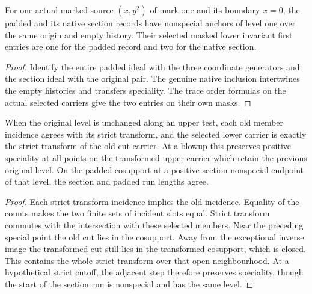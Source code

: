 \begin{theorem}
\label{hir:g1-positive-normal-joint-example}
\leanok
For one actual marked source $(x,y^2)$ of mark one and its boundary
$x=0$, the padded and its native section records have nonspecial
anchors of level one over the same origin and empty history. Their
selected masked lower invariant first entries are one for the
padded record and two for the native section.
\end{theorem}
\begin{proof}
Identify the entire padded ideal with the three coordinate generators
and the section ideal with the original pair. The genuine native
inclusion intertwines the empty histories and transfers speciality.
The trace order formulas on the actual selected carriers give the
two entries on their own masks.
\end{proof}


\begin{theorem}
\label{hir:g1-positive-normal-clock-equality}
\leanok
When the original level is unchanged along an upper test, each old
member incidence agrees with its strict transform, and the selected
lower carrier is exactly the strict transform of the old cut carrier.
At a blowup this preserves positive speciality at all points on the
transformed upper carrier which retain the previous original level.
On the padded cosupport at a positive section-nonspecial endpoint of
that level, the section and padded run lengths agree.
\end{theorem}
\begin{proof}
Each strict-transform incidence implies the old incidence. Equality of
the counts makes the two finite sets of incident slots equal. Strict
transform commutes with the intersection with these selected members.
Near the preceding special point the old cut lies in the cosupport.
Away from the exceptional inverse image the transformed cut still lies
in the transformed cosupport, which is closed. This contains the whole
strict transform over that open neighbourhood. At a hypothetical
strict cutoff, the adjacent step therefore preserves speciality, though
the start of the section run is nonspecial and has the same level.
\end{proof}


